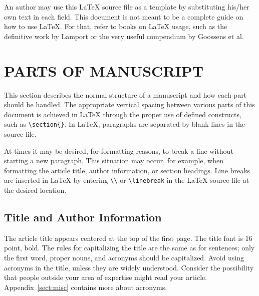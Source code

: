 \documentclass[]{spie}  %
\begin{document}
An author may use this LaTeX source file as a template by substituting his/her own text in each field.  This document is not meant to be a complete guide on how to use LaTeX.  For that, refer to books on LaTeX usage, such as the definitive work by Lamport\cite{Lamport94} or the very useful compendium by Goossens et al.\cite{Goossens97}

\section{PARTS OF MANUSCRIPT} 

This section describes the normal structure of a manuscript and how each part should be handled.  The appropriate vertical spacing between various parts of this document is achieved in LaTeX through the proper use of defined constructs, such as \verb|\section{}|.  In LaTeX, paragraphs are separated by blank lines in the source file. 

At times it may be desired, for formatting reasons, to break a line without starting a new paragraph.  This situation may occur, for example, when formatting the article title, author information, or section headings.  Line breaks are inserted in LaTeX by entering \verb|\\| or \verb|\linebreak| in the LaTeX source file at the desired location.  


\subsection{Title and Author Information} 
\label{sect:title}

The article title appears centered at the top of the first page.  The title font is 16 point, bold.  The rules for capitalizing the title are the same as for sentences; only the first word, proper nouns, and acronyms should be capitalized.  Avoid using acronyms in the title, unless they are widely understood.  Consider the possibility that people outside your area of expertise might read your article.  Appendix~\ref{sect:misc} contains more about acronyms.
\end{document}
